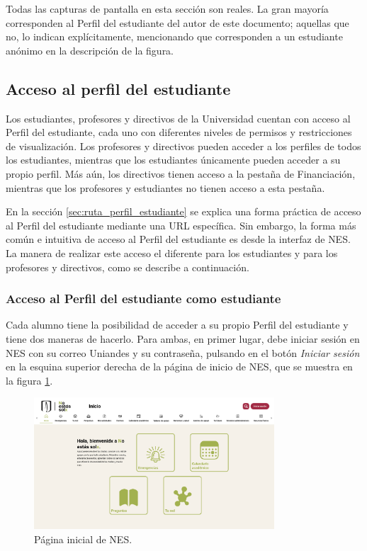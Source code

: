 Todas las capturas de pantalla en esta sección son reales. La gran mayoría corresponden al Perfil del estudiante del autor de este documento; aquellas que no, lo indican explícitamente, mencionando que corresponden a un estudiante anónimo en la descripción de la figura.

\subsection{Acceso al perfil del estudiante}

Los estudiantes, profesores y directivos de la Universidad cuentan con acceso al Perfil del estudiante, cada uno con diferentes niveles de permisos y restricciones de visualización. Los profesores y directivos pueden acceder a los perfiles de todos los estudiantes, mientras que los estudiantes únicamente pueden acceder a su propio perfil. Más aún, los directivos tienen acceso a la pestaña de Financiación, mientras que los profesores y estudiantes no tienen acceso a esta pestaña.

En la sección \ref{sec:ruta_perfil_estudiante} se explica una forma práctica de acceso al Perfil del estudiante mediante una URL específica. Sin embargo, la forma más común e intuitiva de acceso al Perfil del estudiante es desde la interfaz de \gls{NES}. La manera de realizar este acceso el diferente para los estudiantes y para los profesores y directivos, como se describe a continuación.

\subsubsection{Acceso al Perfil del estudiante como estudiante}

Cada alumno tiene la posibilidad de acceder a su propio Perfil del estudiante y tiene dos maneras de hacerlo. Para ambas, en primer lugar, debe iniciar sesión en \gls{NES} con su correo Uniandes y su contraseña, pulsando en el botón \textit{Iniciar sesión} en la esquina superior derecha de la página de inicio de \gls{NES}, que se muestra en la figura \ref{fig:landing}.

\begin{figure}[H]
  \centering
  \includegraphics[width=0.8\textwidth]{img/nes/landing.png}
  \caption{Página inicial de NES.}
  \label{fig:landing}
\end{figure}

